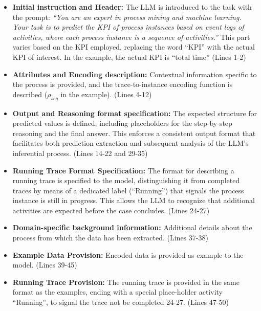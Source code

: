 \documentclass[manuscript,screen,review]{acmart}
\begin{document}
\begin{itemize}  
    \item \textbf{Initial instruction and Header:} The LLM is introduced to the task with the prompt:  
    \textit{“You are an expert in process mining and machine learning. Your task is to predict the KPI of process instances based on event logs of activities, where each process instance is a sequence of activities.”} This part varies based on the KPI employed, replacing the word “KPI” with the actual KPI of interest. In the example, the actual KPI is “total time” (Lines 1-2)

    \item \textbf{Attributes and Encoding description:} Contextual information specific to the process is provided, and the trace-to-instance encoding function is described ($\rho_{seq}$ in the example). (Lines 4-12)

    \item \textbf{Output and Reasoning format specification:} The expected structure for predicted values is defined, including placeholders for the step-by-step reasoning and the final answer. This enforces a consistent output format that facilitates both prediction extraction and subsequent analysis of the LLM's inferential process. (Lines 14-22 and 29-35)
    
    \item \textbf{Running Trace Format Specification:} The format for describing a running trace is specified to the model, distinguishing it from completed traces by means of a dedicated label (``Running'') that signals the process instance is still in progress. This allows the LLM to recognize that additional activities are expected before the case concludes. (Lines 24-27)
    
    \item \textbf{Domain-specific background information:} Additional details about the process from which the data has been extracted. (Lines 37-38)

    \item \textbf{Example Data Provision:} Encoded data is provided as example to the model. (Lines 39-45)

    \item \textbf{Running Trace Provision:} The running trace is provided in the same format as the examples, ending with a special place-holder activity “Running”, to signal the trace not be completed 24-27. (Lines 47-50)
\end{itemize}  
\end{document}
